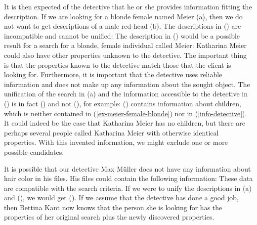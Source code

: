 It is then expected of the detective that he or she provides information fitting the description. If
we are looking for a blonde female named Meier (a), then we
do not want to get descriptions of a male red-head (b). The descriptions in () are incompatible and cannot be unified:
\eal
\ex\label{ex-meier-female-blonde}
\ex {}
\zl
\addlines[-1]
The description in () would be a possible result for a search for a blonde, female individual called Meier:
\ea
\label{info-detective}
\z
Katharina Meier could also have other properties unknown to the detective. The important thing is that the properties known to the detective match those
that the client is looking for. Furthermore, it is important that the detective uses reliable information and does not make up any information about the sought
object. The unification of the search in (a) and the information accessible to the detective in () is in fact () and not (), for example:
\ea
{}
\z
() contains information about children, which is neither contained in
(\ref{ex-meier-female-blonde}) nor in (\ref{info-detective}).
It could indeed be the case that Katharina Meier has no children, but there are perhaps several people
called Katharina Meier with otherwise identical properties. With this invented information, we might
exclude one or more possible candidates. 

It is possible that our detective Max Müller does not have any information about hair color in his
files. His files could contain the following information:
\ea
{}
\z
These data are compatible with the search criteria. If we were to unify the descriptions in (a) and (), we would get ().
If we assume that the detective has done a good job, then Bettina Kant now knows that the person she is looking for has the properties of her
original search plus the newly discovered properties.

